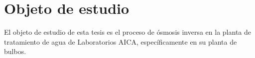 \section*{Objeto de estudio}
El objeto de estudio de esta tesis es el proceso de ósmosis inversa en la planta de tratamiento de agua de Laboratorios AICA, específicamente en su planta de bulbos.